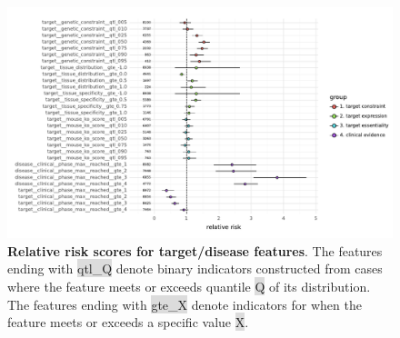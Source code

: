 \documentclass{article}
\begin{document}
\begin{figure}
  \centering
  \captionsetup{width=.9\linewidth}
  \includegraphics[width=1\textwidth]{relative_risk_static_features.pdf}
  \caption{
    \textbf{Relative risk scores for target/disease features}.
    The features ending with \colorbox{Gainsboro}{qtl\_Q} denote binary indicators constructed from cases where the feature meets or exceeds quantile \colorbox{Gainsboro}{Q} of its distribution. The features ending with \colorbox{Gainsboro}{gte\_X} denote indicators for when the feature meets or exceeds a specific value \colorbox{Gainsboro}{X}.
  }
  \label{fig:relative_risk_static_features}
\end{figure}
\end{document}
